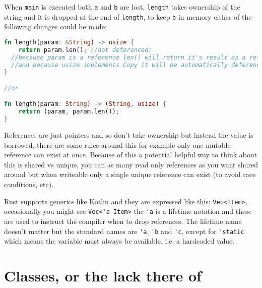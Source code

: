\documentclass[a4paper,11pt]{article}
\begin{document}
When \lstinline{main} is executed both \lstinline{a} and \lstinline{b} are lost, \lstinline{length} takes ownership of the string and it is dropped at the end of \lstinline{length}, to keep \lstinline{b} in memory either of the following changes could be made:
\begin{lstlisting}[language=Rust,frame=single]
fn length(param: &String) -> usize {
	return param.len(); //not deferenced:
  //because param is a reference len() will return it's result as a reference
  //and because usize implements Copy it will be automatically deferenced
}

//or

fn length(param: String) -> (String, usize) {
	return (param, param.len()); 
}
\end{lstlisting}

References are just pointers and so don't take ownership but instead the value is borrowed, there are some rules around this for example only one mutable reference can exist at once. Because of this a potential helpful way to think about this is shared vs unique, you can as many read only references as you want shared around but when writeable only a single unique reference can exist (to avoid race conditions, etc).

Rust supports generics like Kotlin and they are expressed like this: \lstinline{Vec<Item>}, occasionally you might see \lstinline{Vec<'a Item>} the \lstinline{'a} is a lifetime notation and these are used to instruct the compiler when to drop references. The lifetime name doesn't matter but the standard names are \lstinline{'a}, \lstinline{'b} and \lstinline{'c}, except for \lstinline{'static} which means the variable must always be available, i.e. a hardcoded value.

\newpage
\section{Classes, or the lack there of}
\end{document}
